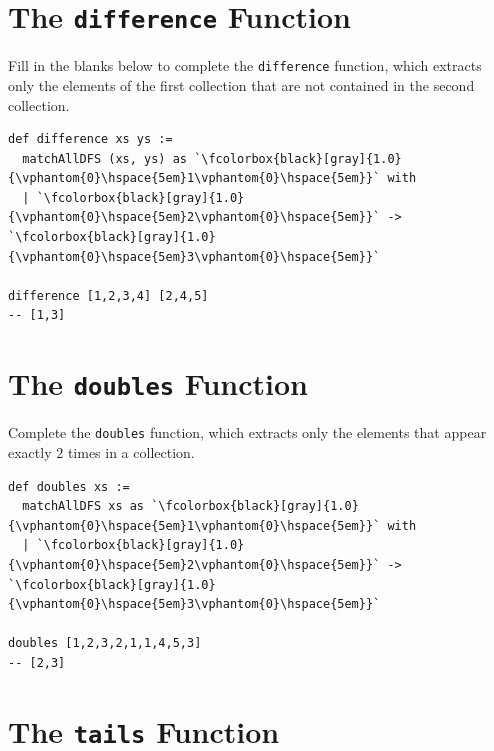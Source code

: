 \section*{The \texttt{difference} Function}

Fill in the blanks below to complete the \lstinline{difference} function, which extracts only the elements of the first collection that are not contained in the second collection.

\begin{lstlisting}[language=egison]
def difference xs ys :=
  matchAllDFS (xs, ys) as `\fcolorbox{black}[gray]{1.0}{\vphantom{0}\hspace{5em}1\vphantom{0}\hspace{5em}}` with
  | `\fcolorbox{black}[gray]{1.0}{\vphantom{0}\hspace{5em}2\vphantom{0}\hspace{5em}}` -> `\fcolorbox{black}[gray]{1.0}{\vphantom{0}\hspace{5em}3\vphantom{0}\hspace{5em}}`

difference [1,2,3,4] [2,4,5]
-- [1,3]
\end{lstlisting}

\section*{The \texttt{doubles} Function}

Complete the \lstinline{doubles} function, which extracts only the elements that appear exactly $2$ times in a collection.

\begin{lstlisting}[language=egison]
def doubles xs :=
  matchAllDFS xs as `\fcolorbox{black}[gray]{1.0}{\vphantom{0}\hspace{5em}1\vphantom{0}\hspace{5em}}` with
  | `\fcolorbox{black}[gray]{1.0}{\vphantom{0}\hspace{5em}2\vphantom{0}\hspace{5em}}` -> `\fcolorbox{black}[gray]{1.0}{\vphantom{0}\hspace{5em}3\vphantom{0}\hspace{5em}}`

doubles [1,2,3,2,1,1,4,5,3]
-- [2,3]
\end{lstlisting}

\section*{The \texttt{tails} Function}

